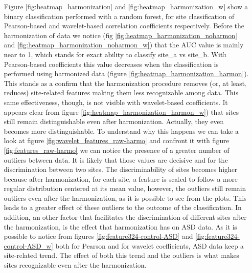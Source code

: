 \documentclass[11pt]{report}
\begin{document}
Figure \ref{fig:heatmap_harmonization} and \ref{fig:heatmap_harmonization_w} show a binary classification performed with a random forest, for site classification of Pearson-based and wavelet-based correlation coefficients respectively.
Before the harmonization of data we notice (fig \ref{fig:heatmap_harmonization_noharmon} and \ref{fig:heatmap_harmonization_noharmon_w}) that the AUC value is mainly near to 1, which stands for exact ability to classify site\_a vs site\_b.
With Pearson-based coefficients this value decreases when the classification is performed using harmonized data (figure \ref{fig:heatmap_harmonization_harmon}).
This stands as a confirm that the harmonization procedure removes (or, at least, reduces) site-related features making them less recognizable among data.
This same effectiveness, though, is not visible with wavelet-based coefficients.
It appears clear from figure \ref{fig:heatmap_harmonization_harmon_w}) that sites still remain distinguishable even after harmonization.
Actually, they even becomes more distinguishable. To understand why this happens we can take a look at figure \ref{fig:wavelet_features_raw-harmo} and confront it with figure \ref{fig:features_raw-harmo} we can notice the presence of a greater number of outliers between data.
It is likely that those values are decisive and for the discrimination between two sites.
The discriminability of sites becomes higher because after harmonization,  for each site, a feature is scaled to follow a more regular distribution centered at its mean value, however, the outliers still remain outliers even after the harmonization, as it is possible to see from the plots.
This leads to a greater effect of these outliers to the outcome of the classification.
In addition, an other factor that facilitates the discrimination of different sites after the harmonization, is the effect that harmonization has on ASD data. 
As it is possible to notice from figures \ref{fig:feature324-control-ASD} and \ref{fig:feature324-control-ASD_w} both for Pearson and for wavelet coefficients, ASD data keep a site-related trend.
The effect of both this trend and the outliers is what makes sites recognizable even after the harmonization.
\end{document}

